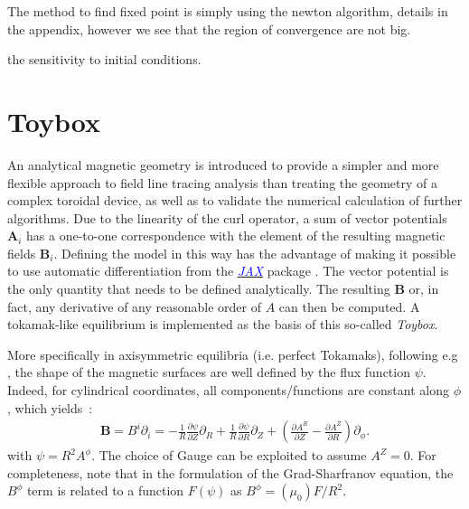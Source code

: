 The method to find fixed point is simply using the newton algorithm, details in the appendix, however we see that the region of convergence are not big.

\begin{figure}[H]
    \hfill
    \caption{}
\end{figure}

the sensitivity to initial conditions.

\chapter{Toybox}\label{ch:toybox}
An analytical magnetic geometry is introduced to provide a simpler and more flexible approach to field line tracing analysis than treating the geometry of a complex toroidal device, as well as to validate the numerical calculation of further algorithms. Due to the linearity of the curl operator, a sum of vector potentials $\textbf{A}_i$ has a one-to-one correspondence with the element of the resulting magnetic fields $\textbf{B}_i$. Defining the model in this way has the advantage of making it possible to use automatic differentiation from the 
\href{https://jax.readthedocs.io/en/latest/index.html}{\textcolor{blue}{\textit{JAX}}}
package \cite{bradbury_jax_2018}. The vector potential is the only quantity that needs to be defined analytically. The resulting $\textbf{B}$ or, in fact, any derivative of any reasonable order of $A$ can then be computed. A tokamak-like equilibrium is implemented as the basis of this so-called \textit{Toybox}.

More specifically in axisymmetric equilibria (i.e. perfect Tokamaks), following e.g \cite[p.108]{wesson_tokamaks_2011}, the shape of the magnetic surfaces are well defined by the flux function  $\psi$. Indeed, for cylindrical coordinates, all components/functions are constant along $\phi$, which yields~:
\begin{align*}
    \textbf{B} = B^i\partial_i = -\frac{1}{R}\frac{\partial\psi}{\partial Z}\partial_R +\frac{1}{R}\frac{\partial\psi}{\partial R}\partial_Z + \left(\frac{\partial A^R}{\partial Z} - \frac{\partial A^Z}{\partial R}\right)\partial_\phi.
\end{align*}
with $\psi = R^2 A^\phi$. The choice of Gauge can be exploited to assume $A^Z = 0$. For completeness, note that in the formulation of the Grad-Sharfranov equation, the $B^\phi$ term is related to a function $F(\psi)$ as $B^\phi = (\mu_0) F/R^2$.

